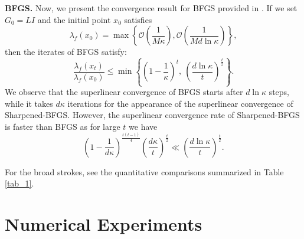 \documentclass[11pt]{article}
\numberwithin{assumption}{section}
\numberwithin{remark}{section}
\numberwithin{theorem}{section}
\begin{document}
\noindent \textbf{BFGS.} Now, we present the convergence result for BFGS provided in \cite{rodomanov2020ratesnew}. If we set $G_0 = LI$ and the initial point $x_0$ satisfies
\begin{equation*}
    \lambda_f(x_0) = \max\left\{\mathcal{O}\left(\frac{1}{M\kappa}\right), \mathcal{O}\left(\frac{1}{Md\ln{\kappa}}\right)\right\},
\end{equation*}
then the iterates of BFGS satisfy:
\begin{equation*}
\frac{\lambda_f(x_t)}{\lambda_f(x_0)} \leq
\min\left\{\left(1 \!-\! \frac{1}{\kappa}\right)^t ,\ \left(\frac{d\ln{\kappa}}{t}\right)^{\frac{t}{2}} \right\}.
\end{equation*}
We observe that the superlinear convergence of BFGS starts after $d\ln{\kappa}$ steps, while it takes $d\kappa$ iterations for the appearance of the superlinear convergence of Sharpened-BFGS. However, the superlinear convergence rate of Sharpened-BFGS is faster than BFGS as for large $t$ we have
\begin{equation*}
\left(1 \!-\! \frac{1}{d\kappa}\right)^{\!\frac{t(t - 1)}{4}}\!\! \left(\frac{d\kappa}{t}\right)^{\frac{t}{2}}
\ll 
\left(\frac{d\ln{\kappa}}{t}\right)^{\frac{t}{2}}.
\end{equation*}

For the broad strokes, see the quantitative comparisons summarized in Table \ref{tab_1}.

\section{Numerical Experiments}\label{sec:numerical}
\end{document}
